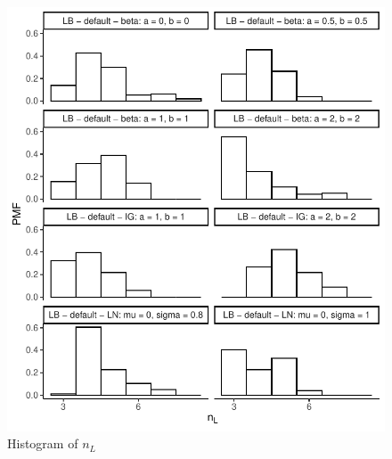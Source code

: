 \documentclass{amsart}
\begin{document}
\begin{figure}[ht]
	\centering
	\includegraphics[width=0.95\linewidth]{hist_nl_3.pdf}
	\caption{Histogram of $n_L$}
	\label{fig:hist:nl:3}
\end{figure}
\end{document}
